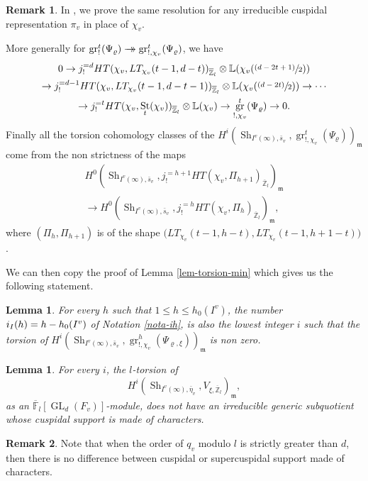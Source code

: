 \documentclass[JEP,XML,SOM,Unicode,published]{cedram}
\newcommand{\onto}{\mathchoice{\to\hspace*{-5mm}\to}{\to\hspace*{-2.85mm}\to}{\to\hspace*{-3mm}\to}{\to\hspace*{-3mm}\to}}
\newcommand{\psfrac}[2]{\sfrac{(#1)}{#2}}
\DeclareMathOperator{\GL}{GL}
\theoremstyle{plain}
\newtheorem{lemma}[equation]{Lemma}
\theoremstyle{definition}
\newtheorem*{remark}{Remark}
\numberwithin{equation}{subsection}
\newcommand\Fm{{\mathbb F}}
\newcommand\Zm{{\mathbb Z}}
\newcommand\Lm{{\mathbb L}}
\DeclareMathOperator{\sh}{Sh}
\DeclareMathOperator{\st}{St}
\DeclareMathOperator{\gr}{gr}
\let \oo=\infty
\begin{document}
\begin{remark}
In \cite{boyer-duke}, we prove the same resolution for any irreducible
cuspidal representation $\pi_v$ in place of $\chi_v$.
\end{remark}

More generally for $\gr^t_!(\Psi_\varrho) \onto
\gr^t_{!,\chi_v}(\Psi_\varrho)$, we have
\begin{multline} \label{eq-resolution-psi}
0 \to j^{=d}_! HT(\chi_{v},LT_{\chi_v}(t-1,d-t))_{\overline \Zm_l} \otimes \Lm(\chi_{v}(\psfrac{d-2t+1}{2}))\\
\to j^{=d-1}_!HT(\chi_{v},LT_{\chi_{v}}(t-1,d-t-1))_{\overline \Zm_l} \otimes \Lm(\chi_{v}(\psfrac{d-2t}{2}))
\to \cdots \\ \to j^{=t}_! HT(\chi_{v},\st_t(\chi_{v}))_{\overline \Zm_l} \otimes \Lm(\chi_{v})
\to \gr^t_{!,\chi_{v}}(\Psi_\varrho) \to 0.
\end{multline}
Finally all the torsion cohomology classes of the
$H^i(\sh_{I^v(\oo),\bar s_v},\gr^t_{!,\chi_v}(\Psi_\varrho))_{\mathfrak m}$
come from the non strictness of the maps
\begin{multline} \label{eq-map-hmax}
H^{0}(\sh_{I^v(\oo),\bar s_v},j^{=h+1}_! HT(\chi_v,\Pi_{h+1})_{\overline \Zm_l})_{\mathfrak m}\\
\to H^0(\sh_{I^v(\oo),\bar s_v},j^{=h}_! HT(\chi_v,\Pi_h)_{\overline \Zm_l})_{\mathfrak m},
\end{multline}
where $(\Pi_h,\Pi_{h+1})$ is of the shape $\bigl (LT_{\chi_v}(t-1,h-t),LT_{\chi_v}(t-1,h+1-t) \bigr)$.

We can then copy the proof of Lemma \ref{lem-torsion-min} which gives us the following
statement.

\begin{lemma}
For every $h$ such that $1 \leq h \leq h_0(I^v)$, the number
$i_I(h)=h-\nobreak h_0(I^v)$ of Notation \ref{nota-ih}, is also the lowest integer $i$ such that the torsion
of $H^i(\sh_{I^{v}(\oo),\bar s_v},\gr^h_{!,\chi_{v}}(\Psi_{\varrho,\xi}))_{\mathfrak m}$ is non zero.
\end{lemma}

\begin{lemma} \label{lem-generic-sq}
For every $i$, the $l$-torsion of
\[
H^i(\sh_{I^v(\oo),\bar \eta_v},V_{\xi,\overline \Zm_l})_{\mathfrak m},
\]
as an $\overline \Fm_l[\GL_d(F_v)]$-module,
does not have an irreducible generic subquotient
whose cuspidal support is made of characters.
\end{lemma}

\begin{remark}
Note that when the order of $q_v$ modulo $l$ is strictly greater than $d$, then
there is no difference between cuspidal or supercuspidal support made of characters.
\end{remark}
\end{document}
